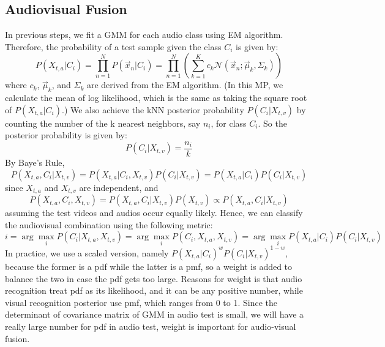 \documentclass{article}
\begin{document}
	\subsection{Audiovisual Fusion}
	In previous steps, we fit a GMM for each audio class using EM algorithm. Therefore, the probability of a test sample given the class $C_i$ is given by:
	$$P(X_{t,a}|C_i) = \prod_{n=1}^N P(\vec{x}_n|C_i) = \prod_{n=1}^N (\sum_{k=1}^K c_k{\mathcal N}(\vec{x}_n; \vec{\mu}_k, \Sigma_k))$$
	where $c_k$, $\vec{\mu}_k$, and $\Sigma_k$ are derived from the EM algorithm. (In this MP, we calculate the mean of log likelihood, which is the same as taking the square root of $P(X_{t,a}|C_i)$.) We also achieve the kNN posterior probability $P(C_i|X_{t,v})$ by counting the number of the k nearest neighbors, say $n_i$, for class $C_i$. So the posterior probability is given by:
	$$P(C_i|X_{t,v}) = \frac{n_i}{k}$$
	By Baye's Rule,
	$$P(X_{t,a},C_i|X_{t,v}) = P(X_{t,a}|C_i,X_{t,v})P(C_i|X_{t,v}) = P(X_{t,a}|C_i)P(C_i|X_{t,v})$$
	since $X_{t,a}$ and $X_{t,v}$ are independent, and
	$$P(X_{t,a},C_i,X_{t,v}) = P(X_{t,a},C_i|X_{t,v})P(X_{t,v}) \propto P(X_{t,a},C_i|X_{t,v})$$
	assuming the test videos and audios occur equally likely.
	Hence, we can classify the audiovisual combination using the following metric:
	$$i = \arg\max_i P(C_i|X_{t,a},X_{t,v}) = \arg\max_i P(C_i,X_{t,a},X_{t,v}) = \arg\max_i P(X_{t,a}|C_i)P(C_i|X_{t,v})$$
	In practice, we use a scaled version, namely $P(X_{t,a}|C_i)^wP(C_i|X_{t,v})^{1-w}$, because the former is a pdf while the latter is a pmf, so a weight is added to balance the two in case the pdf gets too large. Reasons for weight is that audio recognition treat pdf as its likelihood, and it can be any positive number, while visual recognition posterior use pmf, which ranges from 0 to 1. Since the determinant of covariance matrix of GMM in audio test is small, we will have a really large number for pdf in audio test, weight is important for audio-visual fusion. 
\end{document}
